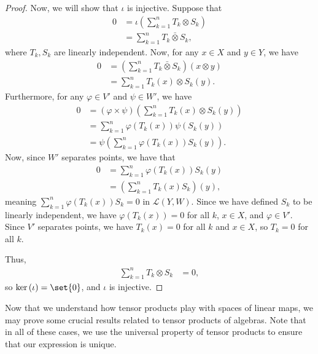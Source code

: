 \begin{proof}
  Now, we will show that $\iota$ is injective. Suppose that
  \begin{align*}
    0 &= \iota\left( \sum_{k=1}^{n}T_k\otimes S_k \right)\\
      &= \sum_{k=1}^{n}T_k\bar{\otimes}S_k,
  \end{align*}
  where $T_k,S_k$ are linearly independent. Now, for any $x\in X$ and $y\in Y$, we have
  \begin{align*}
    0 &= \left( \sum_{k=1}^{n}T_k\bar{\otimes}S_k \right)\left( x\otimes y \right)\\
      &= \sum_{k=1}^{n}T_k\left( x \right)\otimes S_k\left( y \right).
  \end{align*}
  Furthermore, for any $\varphi\in V'$ and $\psi\in W'$, we have
  \begin{align*}
    0 &= \left( \varphi\times \psi \right)\left( \sum_{k=1}^{n}T_k\left( x \right)\otimes S_k\left( y \right) \right)\\
      &= \sum_{k=1}^{n}\varphi\left( T_k\left( x \right) \right)\psi\left( S_k\left( y \right) \right)\\
      &= \psi\left( \sum_{k=1}^{n}\varphi\left( T_k\left( x \right) \right)S_k\left( y \right) \right).
  \end{align*}
  Now, since $W'$ separates points, we have that
  \begin{align*}
    0 &= \sum_{k=1}^{n}\varphi\left( T_k\left( x \right) \right)S_k\left( y \right)\\
      &= \left( \sum_{k=1}^{n} T_k\left( x \right)S_k\right)\left( y \right),
  \end{align*}
  meaning $\displaystyle\sum_{k=1}^{n}\varphi\left( T_k\left( x \right) \right)S_k = 0$ in $\mathcal{L}\left( Y,W \right)$. Since we have defined $S_k$ to be linearly independent, we have $\varphi\left( T_k\left( x \right) \right) = 0$ for all $k$, $x\in X$, and $\varphi\in V'$. Since $V'$ separates points, we have $T_k(x) = 0$ for all $k$ and $x\in X$, so $T_k = 0$ for all $k$.\newline

  Thus, 
  \begin{align*}
    \sum_{k=1}^{n}T_k\otimes S_k &= 0,
  \end{align*}
  so $\ker\left( \iota \right) = \set{0}$, and $\iota$ is injective.
\end{proof}
Now that we understand how tensor products play with spaces of linear maps, we may prove some crucial results related to tensor products of algebras. Note that in all of these cases, we use the universal property of tensor products to ensure that our expression is unique.
